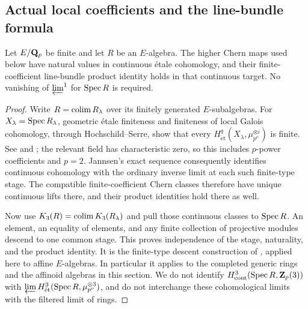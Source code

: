 \subsection{Actual local coefficients and the line-bundle formula}

\begin{lemma}\label{d3:lem:continuouschern}
Let $E/\mathbf Q_p$ be finite and let $R$ be an $E$-algebra. The higher Chern maps used below have natural values in continuous \'etale cohomology, and their finite-coefficient line-bundle product identity holds in that continuous target. No vanishing of $\varprojlim^1$ for $\operatorname{Spec} R$ is required.
\end{lemma}
\begin{proof}
Write $R=\operatorname*{colim} R_\lambda$ over its finitely generated $E$-subalgebras. For $X_\lambda=\operatorname{Spec} R_\lambda$, geometric \'etale finiteness and finiteness of local Galois cohomology, through Hochschild--Serre, show that every
$H^q_{\mathrm{\acute et}}(X_\lambda,\mu_{p^\nu}^{\otimes i})$ is finite. See \cite[Theorem~19.1(b)]{MilneEtale} and \cite[Chapter~I, Corollary~2.3]{MilneDuality}; the relevant field has characteristic zero, so this includes $p$-power coefficients and $p=2$. Jannsen's exact sequence \cite[equation~(0.2)]{Jannsen} consequently identifies continuous cohomology with the ordinary inverse limit at each such finite-type stage. The compatible finite-coefficient Chern classes therefore have unique continuous lifts there, and their product identities hold there as well.

Now use $K_3(R)=\operatorname*{colim} K_3(R_\lambda)$ and pull those continuous classes to $\operatorname{Spec} R$. An element, an equality of elements, and any finite collection of projective modules descend to one common stage. This proves independence of the stage, naturality, and the product identity. It is the finite-type descent construction of \cite[Section~5.1]{LevineIndK3}, applied here to affine $E$-algebras. In particular it applies to the completed generic rings and the affinoid algebras in this section. We do not identify $H^3_{\mathrm{cont}}(\operatorname{Spec} R,\mathbf Z_p(3))$ with $\varprojlim H^3_{\mathrm{\acute et}}(\operatorname{Spec} R,\mu_{p^\nu}^{\otimes3})$, and do not interchange these cohomological limits with the filtered limit of rings.
\end{proof}

